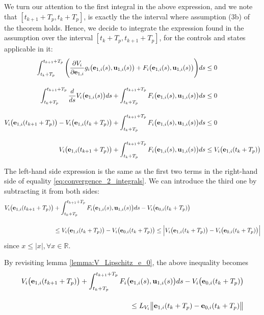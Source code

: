 \begin{gg_box}
  We turn our attention to the first integral in the above expression, and we
  note that $[t_{k+1} + T_p, t_k + T_p]$, is exactly the
  the interval where assumption (3b) of the theorem holds. Hence,
  we decide to integrate the expression found in the assumption over the
  interval $[t_k + T_p, t_{k+1} + T_p]$, for the controls and states applicable
  in it:
  \begin{align}
    \int_{t_k + T_p}^{t_{k+1} + T_p} \Bigg(\dfrac{\partial V_i}{\partial \bm{\mathbf{e}}_{1,i}} g_i\big(\bm{\mathbf{e}}_{1,i}(s), \bm{\mathbf{u}}_{1,i}(s)\big)
    + F_i\big(\bm{\mathbf{e}}_{1,i}(s), \bm{\mathbf{u}}_{1,i}(s)\big)\Bigg) ds &\leq 0 \\[2.5ex]
    \int_{t_k + T_p}^{t_{k+1} + T_p} \dfrac{d}{ds} V_i\big(\bm{\mathbf{e}}_{1,i}(s)\big) d s
    + \int_{t_k + T_p}^{t_{k+1} + T_p} F_i\big(\bm{\mathbf{e}}_{1,i}(s), \bm{\mathbf{u}}_{1,i}(s)\big) ds &\leq 0 \\[2.5ex]
    V_i\big(\bm{\mathbf{e}}_{1,i}(t_{k+1} + T_p)\big) - V_i\big(\bm{\mathbf{e}}_{1,i}(t_k + T_p)\big)
    + \int_{t_k + T_p}^{t_{k+1} + T_p} F_i\big(\bm{\mathbf{e}}_{1,i}(s), \bm{\mathbf{u}}_{1,i}(s)\big) ds &\leq 0 \\[2.5ex]
    V_i\big(\bm{\mathbf{e}}_{1,i}(t_{k+1} + T_p)\big)
    + \int_{t_k + T_p}^{t_{k+1} + T_p} F_i\big(\bm{\mathbf{e}}_{1,i}(s), \bm{\mathbf{u}}_{1,i}(s)\big) ds &\leq V_i\big(\bm{\mathbf{e}}_{1,i}(t_k + T_p)\big)
  \end{align}

  The left-hand side expression is the same as the first two terms in the
  right-hand side of equality \eqref{eq:convergence_2_integrals}. We can
  introduce the third one by subtracting it from both sides:
  \begin{align}
    V_i\big(\bm{\mathbf{e}}_{1,i}(t_{k+1} + T_p)\big)
    &+ \int_{t_k + T_p}^{t_{k+1} + T_p} F_i\big(\bm{\mathbf{e}}_{1,i}(s), \bm{\mathbf{u}}_{1,i}(s)\big) ds
    - V_i\big(\bm{\mathbf{e}}_{0,i}(t_k + T_p)\big) \\[2.5ex]
    &\leq V_i\big(\bm{\mathbf{e}}_{1,i}(t_k + T_p)\big)
    - V_i\big(\bm{\mathbf{e}}_{0,i}(t_k + T_p)\big)
    \leq \Big|V_i\big(\bm{\mathbf{e}}_{1,i}(t_k + T_p)\big)
    - V_i\big(\bm{\mathbf{e}}_{0,i}(t_k + T_p)\big)\Big|
  \end{align}
  since $x \leq |x|, \forall x \in \mathbb{R}$.

  By revisiting lemma \eqref{lemma:V_Lipschitz_e_0}, the above inequality
  becomes
  \begin{align}
    V_i\big(\bm{\mathbf{e}}_{1,i}(t_{k+1} + T_p)\big)
    + \int_{t_k + T_p}^{t_{k+1} + T_p} F_i\big(\bm{\mathbf{e}}_{1,i}(s), \bm{\mathbf{u}}_{1,i}(s)\big) ds
    - V_i\big(\bm{\mathbf{e}}_{0,i}(t_k + T_p)\big) \\[2.5ex]
    \leq L_{V_i} \big\|\bm{\mathbf{e}}_{1,i}(t_k + T_p) - \bm{\mathbf{e}}_{0,i}(t_k + T_p)\big\|
  \end{align}


\end{gg_box}
